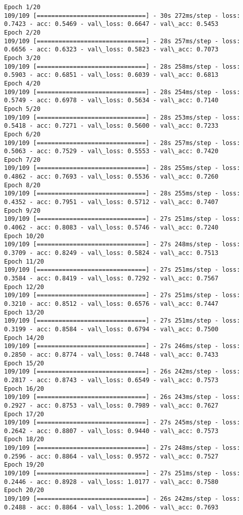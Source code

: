 \documentclass[11pt]{article}
\begin{document}
    \begin{Verbatim}[commandchars=\\\{\}]
Epoch 1/20
109/109 [==============================] - 30s 272ms/step - loss: 0.7423 - acc: 0.5469 - val\_loss: 0.6647 - val\_acc: 0.5453
Epoch 2/20
109/109 [==============================] - 28s 257ms/step - loss: 0.6656 - acc: 0.6323 - val\_loss: 0.5823 - val\_acc: 0.7073
Epoch 3/20
109/109 [==============================] - 28s 258ms/step - loss: 0.5903 - acc: 0.6851 - val\_loss: 0.6039 - val\_acc: 0.6813
Epoch 4/20
109/109 [==============================] - 28s 254ms/step - loss: 0.5749 - acc: 0.6978 - val\_loss: 0.5634 - val\_acc: 0.7140
Epoch 5/20
109/109 [==============================] - 28s 253ms/step - loss: 0.5418 - acc: 0.7271 - val\_loss: 0.5600 - val\_acc: 0.7233
Epoch 6/20
109/109 [==============================] - 28s 257ms/step - loss: 0.5063 - acc: 0.7529 - val\_loss: 0.5553 - val\_acc: 0.7420
Epoch 7/20
109/109 [==============================] - 28s 255ms/step - loss: 0.4862 - acc: 0.7693 - val\_loss: 0.5536 - val\_acc: 0.7260
Epoch 8/20
109/109 [==============================] - 28s 255ms/step - loss: 0.4352 - acc: 0.7951 - val\_loss: 0.5712 - val\_acc: 0.7407
Epoch 9/20
109/109 [==============================] - 27s 251ms/step - loss: 0.4062 - acc: 0.8083 - val\_loss: 0.5746 - val\_acc: 0.7240
Epoch 10/20
109/109 [==============================] - 27s 248ms/step - loss: 0.3709 - acc: 0.8249 - val\_loss: 0.5824 - val\_acc: 0.7513
Epoch 11/20
109/109 [==============================] - 27s 251ms/step - loss: 0.3584 - acc: 0.8419 - val\_loss: 0.7292 - val\_acc: 0.7567
Epoch 12/20
109/109 [==============================] - 27s 251ms/step - loss: 0.3210 - acc: 0.8512 - val\_loss: 0.6576 - val\_acc: 0.7447
Epoch 13/20
109/109 [==============================] - 27s 251ms/step - loss: 0.3199 - acc: 0.8584 - val\_loss: 0.6794 - val\_acc: 0.7500
Epoch 14/20
109/109 [==============================] - 27s 246ms/step - loss: 0.2850 - acc: 0.8774 - val\_loss: 0.7448 - val\_acc: 0.7433
Epoch 15/20
109/109 [==============================] - 26s 242ms/step - loss: 0.2817 - acc: 0.8743 - val\_loss: 0.6549 - val\_acc: 0.7573
Epoch 16/20
109/109 [==============================] - 26s 243ms/step - loss: 0.2927 - acc: 0.8753 - val\_loss: 0.7989 - val\_acc: 0.7627
Epoch 17/20
109/109 [==============================] - 27s 245ms/step - loss: 0.2642 - acc: 0.8807 - val\_loss: 0.9440 - val\_acc: 0.7573
Epoch 18/20
109/109 [==============================] - 27s 248ms/step - loss: 0.2596 - acc: 0.8864 - val\_loss: 0.9572 - val\_acc: 0.7527
Epoch 19/20
109/109 [==============================] - 27s 251ms/step - loss: 0.2446 - acc: 0.8928 - val\_loss: 1.0177 - val\_acc: 0.7580
Epoch 20/20
109/109 [==============================] - 26s 242ms/step - loss: 0.2488 - acc: 0.8864 - val\_loss: 1.2006 - val\_acc: 0.7693

    \end{Verbatim}
\end{document}
